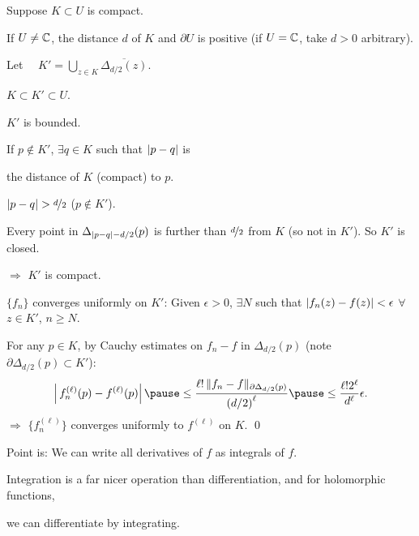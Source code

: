 \documentclass[10pt,aspectratio=169]{beamer}
\begin{document}
\begin{frame}
Suppose $K \subset U$ is compact.

\medskip
\pause

If $U \not= {\mathbb{C}}$, the distance $d$ of
$K$ and $\partial U$ is positive
(if $U={\mathbb{C}}$, take $d > 0$ arbitrary).

\medskip
\pause

Let
$\displaystyle
\quad
K' = \bigcup_{z \in K} \overline{\Delta_{d/2}(z)} .
$

\medskip
\pause

$K \subset K' \subset U$.

\vspace*{-0.5in}
\hspace*{2.5in}%
\pause

\vspace*{-0.6in}

$K'$ is bounded.

\pause

If $p \notin K'$, $\exists q \in K$ such that
$\lvert {p-q} \rvert$ is

the distance of $K$ (compact) to $p$.

\pause
$\lvert {p-q} \rvert > \nicefrac{d}{2}$  \quad ($p\not\in K'$).

\pause
Every point in $\Delta_{\lvert {p-q} \rvert-d/2}(p)$
is further than $\nicefrac{d}{2}$ from $K$ (so not in $K'$).  So $K'$ is closed.

\pause

$\Rightarrow$ $K'$ is compact.

\medskip
\pause

$\{ f_n \}$ converges uniformly on $K'$:
\pause
Given $\epsilon > 0$, $\exists N$ such that
$\lvert {f_n(z)-f(z)} \rvert < \epsilon$ $\forall$ $z \in K'$, $n \geq N$.

\medskip
\pause
For any $p \in K$, by Cauchy estimates
on $f_n-f$
in $\Delta_{d/2}(p)$ (note $\partial \Delta_{d/2}(p) \subset K'$):
\pause
\begin{equation*}
\abs{
\,
f_n^{(\ell)}(p)
-
f^{(\ell)}(p)
}
\pause
\leq
\frac{\ell! \, \snorm{f_n-f}_{\partial \Delta_{d/2}(p)}}{{(d/2)}^{\ell}}
\pause
\leq
\frac{\ell!2^\ell}{d^\ell}\epsilon .
\end{equation*}
\pause
$\Rightarrow$ $\bigl\{ f_n^{(\ell)} \bigr\}$ converges uniformly to $f^{(\ell)}$ on $K$.
\qed
\end{frame}

\begin{frame}

Point is: We can write all derivatives of $f$ as integrals of $f$.

\medskip
\pause

Integration is a far nicer operation than differentiation, and for
holomorphic functions,

we can differentiate by integrating.
\end{frame}
\end{document}
